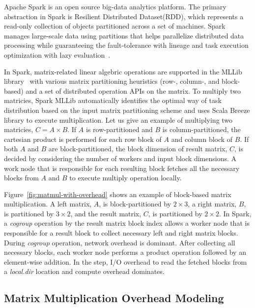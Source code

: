 \documentclass[10pt, conference, compsocconf]{IEEEtran}
\begin{document}
Apache Spark is an open source big-data analytics platform. The primary abstraction in Spark is Resilient Distributed Dataset(RDD), which represents a read-only collection of objects partitioned across a set of machines. Spark manages large-scale data using partitions that helps parallelize distributed data processing while guaranteeing the fault-tolerance with lineage and task execution optimization with lazy evaluation~\cite{spark}.

In Spark, matrix-related linear algebric operations are supported in the MLLib library~\cite{spark-mm} with various matrix partitioning heuristics (row-, column-, and block-based) and a set of distributed operation APIs on the matrix. To multiply two matricies, Spark MLLib automatically identifies the optimal way of task distribution based on the input matrix partitioning scheme and uses Scala Breeze library to execute multiplication. Let us give an example of multiplying two matricies, $C = A \times B$. If $A$ is row-partitioned and $B$ is column-partitioned, the cartesian product is performed for each row block of $A$ and column block of $B$. If both $A$ and $B$ are block-partitioned, the block dimension of result matrix, $C$, is decided by considering the number of workers and input block dimensions. A work node that is responsible for each resulting block fetches all the necessary blocks from $A$ and $B$ to execute multiply operation locally.


Figure~\ref{fig:matmul-with-overhead} shows an example of block-based matrix multiplication. A left matrix, $A$, is block-partitioned by $2 \times 3$, a right matrix, $B$, is partitioned by $3 \times 2$, and the result matrix, $C$, is partitioned by $2 \times 2$. In Spark, a \textit{cogroup} operation by the result matrix block index allows a worker node that is responsible for a result block to collect necessary left and right matrix blocks. During \textit{cogroup} operation, network overhead is dominant. After collecting all necessary blocks, each worker node performs a product operation followed by an element-wise addition. In the step, I/O overhead to read the fetched blocks from a \textit{local.dir} location and compute overhead dominates.

\subsection{Matrix Multiplication Overhead Modeling}
\end{document}
